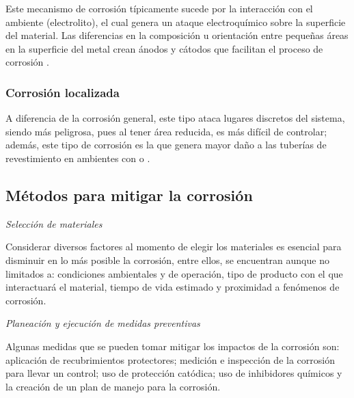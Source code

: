 				Este mecanismo de corrosión típicamente sucede por la interacción con el ambiente (electrolito), el cual genera un ataque electroquímico sobre la superficie del material. Las diferencias en la composición u orientación entre pequeñas áreas en la superficie del metal crean ánodos y cátodos que facilitan el proceso de corrosión \cites{rodriguez_suarez_industria_2017}{ampp_what_nodate}.

			\subsubsection{Corrosión localizada}

				A diferencia de la corrosión general, este tipo ataca lugares discretos del sistema, siendo más peligrosa, pues al tener área reducida, es más difícil de controlar; además, este tipo de corrosión es la que genera mayor daño a las tuberías de revestimiento en ambientes con  o .

		\subsection{Métodos para mitigar la corrosión}
			
			\textit{Selección de materiales}\par
			Considerar diversos factores al momento de elegir los materiales es esencial para disminuir en lo más posible la corrosión, entre ellos, se encuentran aunque no limitados a: condiciones ambientales y de operación, tipo de producto con el que interactuará el material, tiempo de vida estimado y proximidad a fenómenos de corrosión.
			
			\textit{Planeación y ejecución de medidas preventivas}\par
			Algunas medidas que se pueden tomar mitigar los impactos de la corrosión son: aplicación de recubrimientos protectores; medición e inspección de la corrosión para llevar un control; uso de protección catódica; uso de inhibidores químicos y la creación de un plan de manejo para la corrosión.